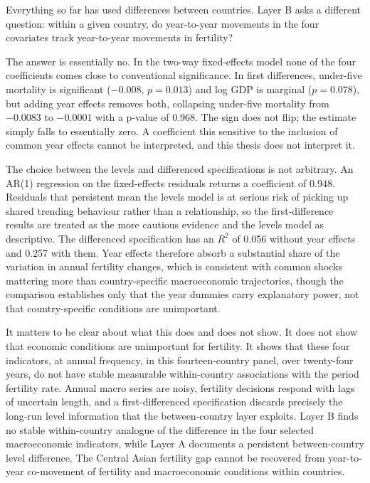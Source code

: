 Everything so far has used differences between countries. Layer B asks a different question: within a given country, do year-to-year movements in the four covariates track year-to-year movements in fertility?



The answer is essentially no. In the two-way fixed-effects model none of the four coefficients comes close to conventional significance. In first differences, under-five mortality is significant ($-0.008$, $p = 0.013$) and log GDP is marginal ($p = 0.078$), but adding year effects removes both, collapsing under-five mortality from $-0.0083$ to $-0.0001$ with a p-value of 0.968. The sign does not flip; the estimate simply falls to essentially zero. A coefficient this sensitive to the inclusion of common year effects cannot be interpreted, and this thesis does not interpret it.

The choice between the levels and differenced specifications is not arbitrary. An AR(1) regression on the fixed-effects residuals returns a coefficient of $0.948$. Residuals that persistent mean the levels model is at serious risk of picking up shared trending behaviour rather than a relationship, so the first-difference results are treated as the more cautious evidence and the levels model as descriptive. The differenced specification has an $R^2$ of 0.056 without year effects and 0.257 with them. Year effects therefore absorb a substantial share of the variation in annual fertility changes, which is consistent with common shocks mattering more than country-specific macroeconomic trajectories, though the comparison establishes only that the year dummies carry explanatory power, not that country-specific conditions are unimportant.

It matters to be clear about what this does and does not show. It does not show that economic conditions are unimportant for fertility. It shows that these four indicators, at annual frequency, in this fourteen-country panel, over twenty-four years, do not have stable measurable within-country associations with the period fertility rate. Annual macro series are noisy, fertility decisions respond with lags of uncertain length, and a first-differenced specification discards precisely the long-run level information that the between-country layer exploits. Layer B finds no stable within-country analogue of the difference in the four selected macroeconomic indicators, while Layer A documents a persistent between-country level difference. The Central Asian fertility gap cannot be recovered from year-to-year co-movement of fertility and macroeconomic conditions within countries.

